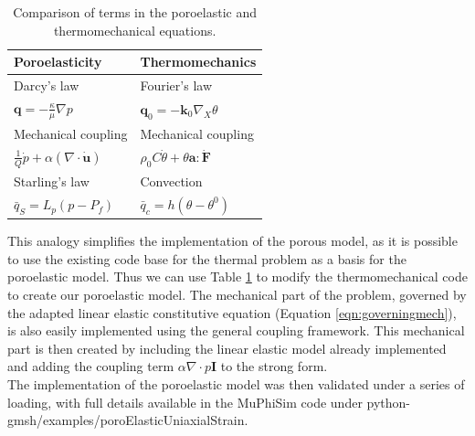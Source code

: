 \documentclass[oneside,11pt,times]{book}
\begin{document}
\begin{table}[htbp]
\caption{Comparison of terms in the poroelastic and thermomechanical equations.}
\centering

\begin{tabular}{ p{4.2cm} p{4.2cm} }
 \toprule
    \textbf{Poroelasticity} & \textbf{Thermomechanics}  \\
    \hline
    \hline
     Darcy's law & Fourier's law \\ 
     $\bm{q} = - \frac{\kappa}{\mu} \nabla p$ & $\bm{q}_0=-\bm{k}_0\nabla_{X}\theta$\\ 
    \hline 
    Mechanical coupling & Mechanical coupling \\
     $\frac{1}{Q} \dot{p} + \alpha  \left(\nabla \cdot \bm{\dot{u}}\right)$ & $\rho_0 C \dot{\theta} + \theta \bm{a}:\bm{\dot{F}}$ \\ 
    \hline
    Starling's law & Convection \\ 
    $\bar{q}_S=L_p(p - P_f)$ & $\bar{q}_c=h(\theta-\theta^0)$ \\ 
    \bottomrule
\end{tabular}
\label{tab:heat_analogy}
\end{table}

This analogy simplifies the implementation of the porous model, as it is possible to use the existing code base for the thermal problem as a basis for the poroelastic model. Thus we can use Table \ref{tab:heat_analogy} to modify the thermomechanical code to create our poroelastic model. The mechanical part of the problem, governed by the adapted linear elastic constitutive equation (Equation \eqref{eqn:governingmech}), is also easily implemented using the general coupling framework. This mechanical part is then created by including the linear elastic model already implemented and adding the coupling term $\alpha \nabla \cdot p \bm{I}$ to the strong form.\\
The implementation of the poroelastic model was then validated under a series of loading, with full details available in the MuPhiSim code under python-gmsh/examples/poroElasticUniaxialStrain.  
\end{document}
